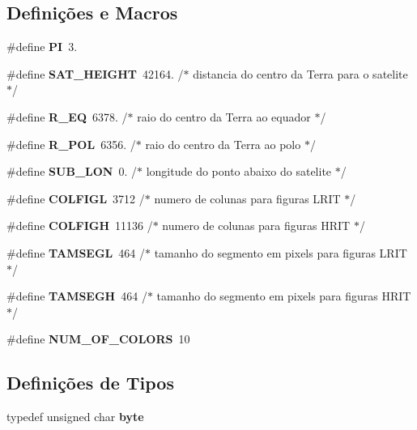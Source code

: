 \subsection*{Definições e Macros}
\begin{DoxyCompactItemize}
\item 
\#define {\bf PI}~3.
\item 
\#define {\bf S\+A\+T\+\_\+\+H\+E\+I\+G\+HT}~42164.             /$\ast$ distancia do centro da Terra para o satelite     $\ast$/
\item 
\#define {\bf R\+\_\+\+EQ}~6378.           /$\ast$ raio do centro da Terra ao equador               $\ast$/
\item 
\#define {\bf R\+\_\+\+P\+OL}~6356.          /$\ast$ raio do centro da Terra ao polo                  $\ast$/
\item 
\#define {\bf S\+U\+B\+\_\+\+L\+ON}~0.             /$\ast$ longitude do ponto abaixo do satelite            $\ast$/
\item 
\#define {\bf C\+O\+L\+F\+I\+GL}~3712               /$\ast$ numero de colunas para figuras L\+R\+IT              $\ast$/
\item 
\#define {\bf C\+O\+L\+F\+I\+GH}~11136               /$\ast$ numero de colunas para figuras H\+R\+IT              $\ast$/
\item 
\#define {\bf T\+A\+M\+S\+E\+GL}~464               /$\ast$ tamanho do segmento em pixels para figuras L\+R\+IT  $\ast$/
\item 
\#define {\bf T\+A\+M\+S\+E\+GH}~464               /$\ast$ tamanho do segmento em pixels para figuras H\+R\+IT  $\ast$/
\item 
\#define {\bf N\+U\+M\+\_\+\+O\+F\+\_\+\+C\+O\+L\+O\+RS}~10
\end{DoxyCompactItemize}
\subsection*{Definições de Tipos}
\begin{DoxyCompactItemize}
\item 
typedef unsigned char {\bf byte}
\end{DoxyCompactItemize}
